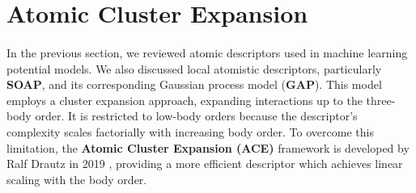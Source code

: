 \section{Atomic Cluster Expansion} \label{sec:2.5} \paragraph{}
In the previous section, we reviewed atomic descriptors used in machine learning potential models. We also discussed local atomistic descriptors, particularly \textbf{SOAP}, and its corresponding Gaussian process model (\textbf{GAP}).
This model employs a cluster expansion approach, expanding interactions up to the three-body order.
It is restricted to low-body orders because the descriptor's complexity scales factorially with increasing body order.
To overcome this limitation, the \textbf{Atomic Cluster Expansion (ACE)} framework is developed by Ralf Drautz in 2019 \cite{Drautz2019}, providing a more efficient descriptor which achieves linear scaling with the body order.

